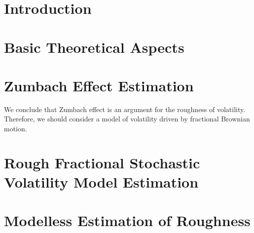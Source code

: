 


    \maketitlepage

    \begin{abstract}
        
    \end{abstract}

    \tableofcontents{}

    \listoffigures{}
    \listoftables{}

    
    \chapter*{Introduction}\setcounter{page}{3}

        

    \chapter{Basic Theoretical Aspects}

        

    \chapter{Zumbach Effect Estimation}

        

        

        We conclude that Zumbach effect is an argument for the roughness of volatility. Therefore, we should consider a model of volatility driven by fractional Brownian motion.

    \chapter{Rough Fractional Stochastic Volatility Model Estimation}

        

        

    \chapter{Modelless Estimation of Roughness}

